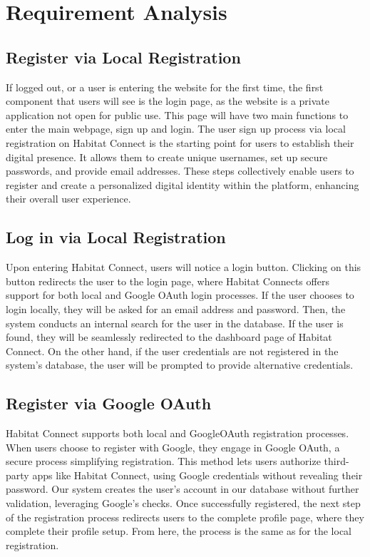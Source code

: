 \documentclass[conference]{IEEEtran}
\begin{document}
\section{Requirement Analysis}
\subsection{Register via Local Registration}
If logged out, or a user is entering the website for the first time, the first component that users will see is the login page, as the website is a private application not open for public use. This page will have two main functions to enter the main webpage, sign up and login. The user sign up process via local registration on Habitat Connect is the starting point for users to establish their digital presence. It allows them to create unique usernames, set up secure passwords, and provide email addresses. These steps collectively enable users to register and create a personalized digital identity within the platform, enhancing their overall user experience. 
\subsection{Log in via Local Registration}
Upon entering Habitat Connect, users will notice a login button. Clicking on this button redirects the user to the login page, where Habitat Connects offers support for both local and Google OAuth login processes. If the user chooses to login locally, they will be asked for an email address and password. Then, the system conducts an internal search for the user in the database. If the user is found, they will be seamlessly redirected to the dashboard page of Habitat Connect. On the other hand, if the user credentials are not registered in the system’s database, the user will be prompted to provide alternative credentials.
\subsection{Register via Google OAuth}
Habitat Connect supports both local and GoogleOAuth registration processes. When users choose to register with Google, they engage in Google OAuth, a secure process simplifying registration. This method lets users authorize third-party apps like Habitat Connect, using Google credentials without revealing their password. Our system creates the user's account in our database without further validation, leveraging Google's checks. Once successfully registered, the next step of the registration process redirects users to the complete profile page, where they complete their profile setup. From here, the process is the same as for the local registration.
\end{document}
